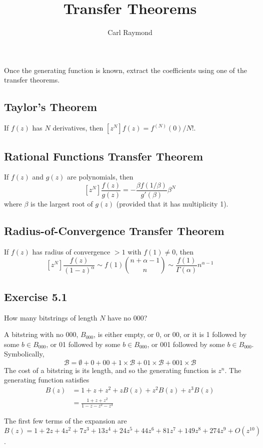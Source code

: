 \documentclass[11pt, oneside]{article}   	%
\title{Transfer Theorems}
\author{Carl Raymond}
\begin{document}
\maketitle

Once the generating function is known, extract the coefficients using one of the transfer theorems.

\subsection*{Taylor's Theorem}
If $f(z)$ has $N$ derivatives, then $[z^N]f(z) = f^{(N)}(0)/N!$.

\subsection*{Rational Functions Transfer Theorem}
If $f(z)$ and $g(z)$ are polynomials, then
\[
	[z^N]\frac{f(z)}{g(z)} = - \frac{\beta f(1/\beta)}{g'(\beta)} \beta^N
\]
where $\beta$ is the largest root of $g(z)$ (provided that it has multiplicity 1).

\subsection*{Radius-of-Convergence Transfer Theorem}
If $f(z)$ has radius of convergence $> 1$ with $f(1) \ne 0$, then
\[
	\left[ z^N \right] \frac{f(z)}{(1-z)^\alpha} \sim f(1)\binom{n+\alpha-1}{n} \sim \frac{f(1)}{\Gamma(\alpha)} n^{\alpha-1}
\]

\subsection*{Exercise 5.1}
How many bitstrings of length $N$ have no $000$?

A bitstring with no $000$, $B_{000}$, is either empty, or 0, or 00, or it is 1 followed by some $b \in B_{000}$, or 01 followed by some  $b \in B_{000}$,
or 001 followed by some $b \in B_{000}$.  Symbolically,
\[
	\mathcal{B} = \emptyset   + 0 + 00 + 1 \times \mathcal{B} + 01 \times \mathcal{B} + 001 \times \mathcal{B}
\]
The cost of a bitstring is its length, and so the generating function is $z^n$. The generating function satisfies
\begin{align*}
	B(z) &= 1 + z + z^2 + zB(z) + z^2B(z) + z^3B(z) \\
		&= \frac{1+z+z^2}{1-z-z^2-z^3}
\end{align*}

The first few terms of the expansion are $B(z) = 1 + 2z + 4z^2 + 7z^3 + 13z^4 + 24z^5 + 44z^6 + 81z^7 + 149z^8 + 274z^9 + O(z^{10})$.
\end{document}
